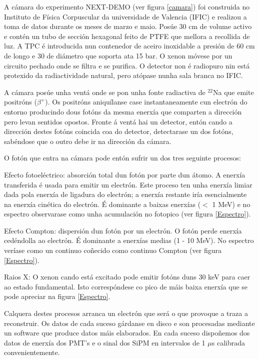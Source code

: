\documentclass[a4paper,12pt]{article}
\begin{document}
A cámara do experimento NEXT-DEMO (ver figura \ref{camara}) foi construida no Instituto de Física Corpuscular da universidade de Valencia (IFIC) e realizou a toma de datos durante os meses de marzo e maio. Posúe 30 cm de volume activo e contén un tubo de sección hexagonal feito de PTFE que mellora a recollida de luz. A TPC é introducida nun contenedor de aceiro inoxidable a presión de 60 cm de longo e 30 de diámetro que soporta ata 15 bar. O xenon móvese por un circuito pechado onde se filtra e se purifica. O detector non é radiopuro nin está protexido da radiactividade natural, pero atópase nunha sala branca no IFIC. 

A cámara posúe unha ventá onde se pon unha fonte radiactiva de $^{22}$Na que emite positróns ($\beta^+$). Os positróns aniquílanse case instantaneamente cun electrón do entorno producindo dous fotóns da mesma enerxía que comparten a dirección pero levan sentidos opostos. Fronte á ventá hai un detector, entón cando a dirección destes fotóns coincida coa do detector, detectarase un dos fotóns, sabéndose que o outro debe ir na dirección da cámara.

O fotón que entra na cámara pode entón sufrir un dos tres seguinte procesos:

\bi
\item Efecto fotoeléctrico: absorción total dun fotón por parte dun átomo. A enerxía transferida é usada para emitir un electrón. Este proceso ten unha enerxía limiar dada pola enerxía de ligadura do electrón; a enerxía restante iría esencialmente na enerxía cinética do electrón. É dominante a baixas enerxías ($<$ 1 MeV) e no espectro observarase como unha acumulación no fotopico (ver figura \ref{Espectro}).
\item Efecto Compton: dispersión dun fotón por un electrón. O fotón perde enerxía cedéndolla ao electrón. É dominante a enerxías medias (1 - 10 MeV). No espectro veríase como un continuo coñecido como continuo Compton (ver figura \ref{Espectro}). 
\item Raios X: O xenon cando está excitado pode emitir fotóns duns 30 keV para caer ao estado fundamental. Isto correspóndese co pico de máis baixa enerxía que se pode apreciar na figura \ref{Espectro}.
\ei

Calquera destes procesos arranca un electrón que será o que provoque a traza a reconstruir. Os datos de cada suceso gárdanse en disco e son procesadas mediante un software que produce datos máis elaborados. En cada suceso dispoñemos dos datos de enerxía dos PMT's e o sinal dos SiPM en intervalos de 1 $\mu$s calibrada convenientemente.
\end{document}
